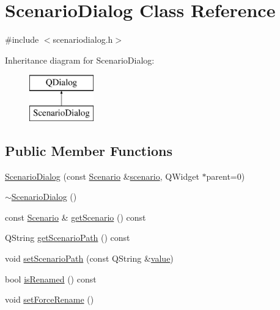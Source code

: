 \hypertarget{class_scenario_dialog}{}\section{Scenario\+Dialog Class Reference}
\label{class_scenario_dialog}


{\ttfamily \#include $<$scenariodialog.\+h$>$}

Inheritance diagram for Scenario\+Dialog\+:\begin{figure}[H]
\begin{center}
\leavevmode
\includegraphics[height=2.000000cm]{d4/da5/class_scenario_dialog}
\end{center}
\end{figure}
\subsection*{Public Member Functions}
\begin{DoxyCompactItemize}
\item 
\mbox{\hyperlink{class_scenario_dialog_a9788301ad6fbf7a61731d7dfe3c1559c}{Scenario\+Dialog}} (const \mbox{\hyperlink{class_scenario}{Scenario}} \&\mbox{\hyperlink{thread__vessels_8cpp_a6c0e7b1e86be7dca81901efbbdd888d7}{scenario}}, Q\+Widget $\ast$parent=0)
\item 
\mbox{\hyperlink{class_scenario_dialog_a76d6060b15d0061a888cf7495c9cf093}{$\sim$\+Scenario\+Dialog}} ()
\item 
const \mbox{\hyperlink{class_scenario}{Scenario}} \& \mbox{\hyperlink{class_scenario_dialog_a0a44ea9f1021cd338e2fd3d0d2365569}{get\+Scenario}} () const
\item 
Q\+String \mbox{\hyperlink{class_scenario_dialog_acc2e11bf3cfc6cd7d53493e19716800f}{get\+Scenario\+Path}} () const
\item 
void \mbox{\hyperlink{class_scenario_dialog_a893f216a71144b774892e26e3fcd06cf}{set\+Scenario\+Path}} (const Q\+String \&\mbox{\hyperlink{diffusion_8cpp_a4b41795815d9f3d03abfc739e666d5da}{value}})
\item 
bool \mbox{\hyperlink{class_scenario_dialog_ab3c5dd6810bc61490da2a8e618eeee1c}{is\+Renamed}} () const
\item 
void \mbox{\hyperlink{class_scenario_dialog_a44102b40dd7d82ef95b7bd92e515aa08}{set\+Force\+Rename}} ()
\end{DoxyCompactItemize}


